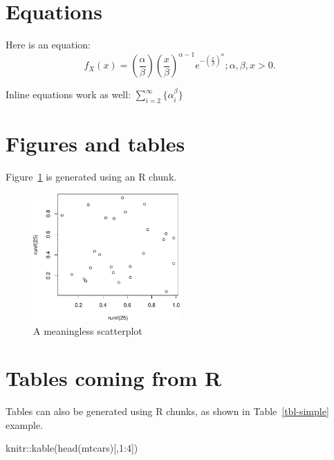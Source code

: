 \documentclass[
  super,
  preprint,
  3p]{elsarticle}
\newenvironment{Shaded}{\begin{snugshade}}{\end{snugshade}}
\newcommand{\DecValTok}[1]{\textcolor[rgb]{0.68,0.00,0.00}{#1}}
\newcommand{\FunctionTok}[1]{\textcolor[rgb]{0.28,0.35,0.67}{#1}}
\newcommand{\NormalTok}[1]{\textcolor[rgb]{0.00,0.23,0.31}{#1}}
\newcommand{\SpecialCharTok}[1]{\textcolor[rgb]{0.37,0.37,0.37}{#1}}
\begin{document}
\hypertarget{equations}{%
\section{Equations}\label{equations}}

Here is an equation: \[ 
  f_{X}(x) = \left(\frac{\alpha}{\beta}\right)
  \left(\frac{x}{\beta}\right)^{\alpha-1}
  e^{-\left(\frac{x}{\beta}\right)^{\alpha}}; 
  \alpha,\beta,x > 0 .
\]

Inline equations work as well: \(\sum_{i = 2}^\infty\{\alpha_i^\beta\}\)

\hypertarget{figures-and-tables}{%
\section{Figures and tables}\label{figures-and-tables}}

Figure~\ref{fig-meaningless} is generated using an R chunk.

\begin{figure}

{\centering \includegraphics[width=0.5\textwidth,height=\textheight]{project_report_files/figure-pdf/fig-meaningless-1.pdf}

}

\caption{\label{fig-meaningless}A meaningless scatterplot}

\end{figure}

\hypertarget{tables-coming-from-r}{%
\section{Tables coming from R}\label{tables-coming-from-r}}

Tables can also be generated using R chunks, as shown in
Table~\ref{tbl-simple} example.

\begin{Shaded}
\begin{Highlighting}[]
\NormalTok{knitr}\SpecialCharTok{::}\FunctionTok{kable}\NormalTok{(}\FunctionTok{head}\NormalTok{(mtcars)[,}\DecValTok{1}\SpecialCharTok{:}\DecValTok{4}\NormalTok{])}
\end{Highlighting}
\end{Shaded}
\end{document}
